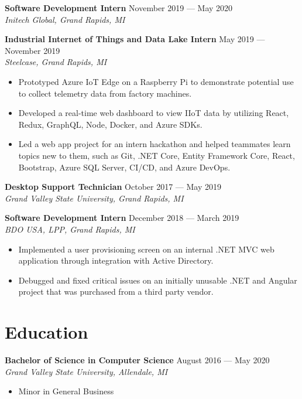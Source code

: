 \documentclass{article}
\begin{document}
\textbf{Software Development Intern} \hfill November 2019 --- May 2020\\
\textit{Initech Global, Grand Rapids, MI}
\medskip


\textbf{Industrial Internet of Things and Data Lake Intern}
\hfill May 2019 --- November 2019\\
\textit{Steelcase, Grand Rapids, MI}
\ifdefined\msftfocused
\begin{itemize}
\item Prototyped Azure IoT Edge on a Raspberry Pi to demonstrate potential use to collect telemetry data from factory machines. 
\item Developed a real-time web dashboard to view IIoT data by utilizing React, Redux, GraphQL, Node, Docker, and Azure SDKs. 
\item Led a web app project for an intern hackathon and helped teammates learn topics new to them, such as Git, .NET Core, Entity Framework Core, React, Bootstrap, Azure SQL Server, CI/CD, and Azure DevOps. 
\end{itemize}
\fi
\medskip


\textbf{Desktop Support Technician} \hfill October 2017 --- May 2019\\
\textit{Grand Valley State University, Grand Rapids, MI}
\medskip

\textbf{Software Development Intern} \hfill December 2018 --- March 2019\\
\textit{BDO USA, LPP, Grand Rapids, MI}
\ifdefined\msftfocused
\begin{itemize}
\item Implemented a user provisioning screen on an internal .NET MVC web application through integration with Active Directory.
\item Debugged and fixed critical issues on an initially unusable .NET and Angular project that was purchased from a third party vendor.
\end{itemize}
\fi
\medskip


\section*{Education}
\textbf{Bachelor of Science in Computer Science} \hfill August 2016 --- May 2020\\
\textit{Grand Valley State University, Allendale, MI}
\begin{itemize}
\item Minor in General Business
\end{itemize}
\end{document}
